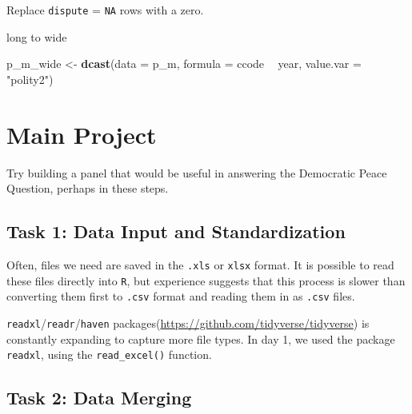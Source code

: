 \documentclass[]{book}
\newenvironment{Shaded}{\begin{snugshade}}{\end{snugshade}}
\newcommand{\DataTypeTok}[1]{\textcolor[rgb]{0.13,0.29,0.53}{#1}}
\newcommand{\DecValTok}[1]{\textcolor[rgb]{0.00,0.00,0.81}{#1}}
\newcommand{\KeywordTok}[1]{\textcolor[rgb]{0.13,0.29,0.53}{\textbf{#1}}}
\newcommand{\NormalTok}[1]{#1}
\newcommand{\OperatorTok}[1]{\textcolor[rgb]{0.81,0.36,0.00}{\textbf{#1}}}
\newcommand{\StringTok}[1]{\textcolor[rgb]{0.31,0.60,0.02}{#1}}
\theoremstyle{definition}
\theoremstyle{definition}
\theoremstyle{definition}
\theoremstyle{remark}
\begin{document}
Replace \texttt{dispute} = \texttt{NA} rows with a zero.

\begin{Shaded}
\end{Shaded}

long to wide

\begin{Shaded}
\begin{Highlighting}[]
\NormalTok{p_m_wide <-}\StringTok{ }\KeywordTok{dcast}\NormalTok{(}\DataTypeTok{data =}\NormalTok{ p_m,}
                  \DataTypeTok{formula =}\NormalTok{ ccode }\OperatorTok{~}\StringTok{ }\NormalTok{year,}
                  \DataTypeTok{value.var =} \StringTok{"polity2"}\NormalTok{)}
\end{Highlighting}
\end{Shaded}

\hypertarget{main-project}{%
\section{Main Project}\label{main-project}}

Try building a panel that would be useful in answering the Democratic Peace Question, perhaps in these steps.

\hypertarget{task-1-data-input-and-standardization}{%
\subsection*{Task 1: Data Input and Standardization}\label{task-1-data-input-and-standardization}}

Often, files we need are saved in the \texttt{.xls} or \texttt{xlsx} format. It is possible to read these files directly into \texttt{R}, but experience suggests that this process is slower than converting them first to \texttt{.csv} format and reading them in as \texttt{.csv} files.

\texttt{readxl}/\texttt{readr}/\texttt{haven} packages(\url{https://github.com/tidyverse/tidyverse}) is constantly expanding to capture more file types. In day 1, we used the package \texttt{readxl}, using the \texttt{read\_excel()} function.

\hypertarget{task-2-data-merging}{%
\subsection*{Task 2: Data Merging}\label{task-2-data-merging}}
\end{document}
